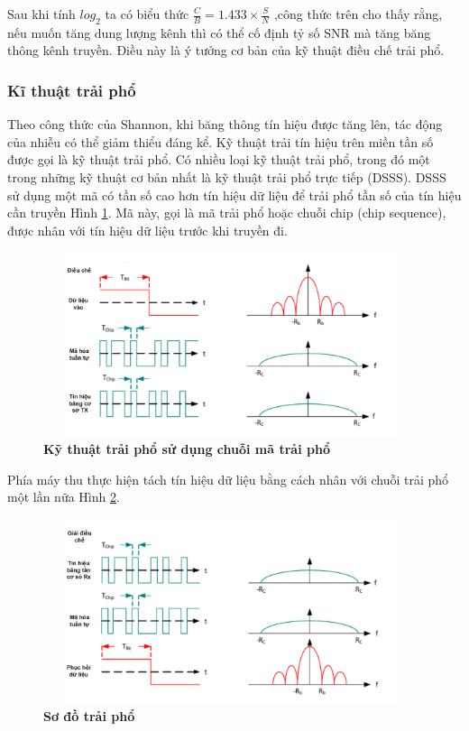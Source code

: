 \documentclass{article} %
\begin{document}
	Sau khi tính $log _2$  ta có biểu thức $\frac{C}{B}=1.433 \times \frac{S}{N}$ ,công thức trên cho thấy rằng, nếu muốn tăng dung lượng kênh thì có thể cố định tỷ số SNR mà tăng băng thông kênh truyền. Điều này là ý tưởng cơ bản của kỹ thuật điều chế trải phổ.
	
	
	\subsubsection{Kĩ thuật trải phổ }	
	
	Theo công thức của Shannon, khi băng thông tín hiệu được tăng lên, tác động của nhiễu có thể giảm thiểu đáng kể. Kỹ thuật trải tín hiệu trên miền tần số được gọi là kỹ thuật trải phổ. Có nhiều loại kỹ thuật trải phổ, trong đó một trong những kỹ thuật cơ bản nhất là kỹ thuật trải phổ trực tiếp (DSSS). DSSS sử dụng một mã có tần số cao hơn tín hiệu dữ liệu để trải phổ tần số của tín hiệu cần truyền Hình \ref{Traipho}. Mã này, gọi là mã trải phổ hoặc chuỗi chip (chip sequence), được nhân với tín hiệu dữ liệu trước khi truyền đi.
	
	\begin{figure}[!ht]
		\centering
		\includegraphics[width=11cm,height=5.4cm]{Images/Traipho.png}
		\caption[Kỹ thuật trải phổ sử dụng chuỗi mã trải phổ \cite{semtech2015an1200}]{\bfseries \fontsize{12pt}{0pt}\selectfont Kỹ thuật trải phổ sử dụng chuỗi mã trải phổ \cite{semtech2015an1200}}
		\label{Traipho}
	\end{figure}
	
	
	Phía máy thu thực hiện tách tín hiệu dữ liệu bằng cách nhân với chuỗi trải phổ một lần nữa Hình \ref{sodotraipho}.
	
	\begin{figure}[!ht]
		\centering
		\includegraphics[width=11cm,height=5.4cm]{Images/sodotraipho.png}
		\caption[Sơ đồ trải phổ \cite{semtech2015an1200}]{\bfseries \fontsize{12pt}{0pt}\selectfont Sơ đồ trải phổ \cite{semtech2015an1200}}
		\label{sodotraipho}
	\end{figure}
	
\end{document}
